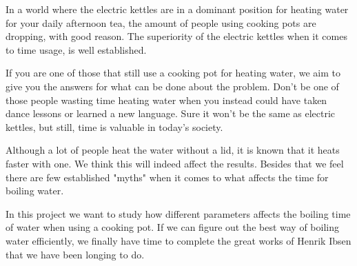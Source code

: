 In a world where the electric kettles are in a dominant position for heating water for your daily afternoon tea, the amount of people using cooking pots are dropping, with good reason. The superiority of the electric kettles when it comes to time usage, is well established.

If you are one of those that still use a cooking pot for heating water, we aim to give you the answers for what can be done about the problem. Don't be one of those people wasting time heating water when you instead could have taken dance lessons or learned a new language. Sure it won't be the same as electric kettles, but still, time is valuable in today's society.

Although a lot of people heat the water without a lid, it is known that it heats faster with one. We think this will indeed affect the results. Besides that we feel there are few established "myths" when it comes to what affects the time for boiling water.

In this project we want to study how different parameters affects the boiling time of water when using a cooking pot. If we can figure out the best way of boiling water efficiently, we finally have time to complete the great works of Henrik Ibsen that we have been longing to do.